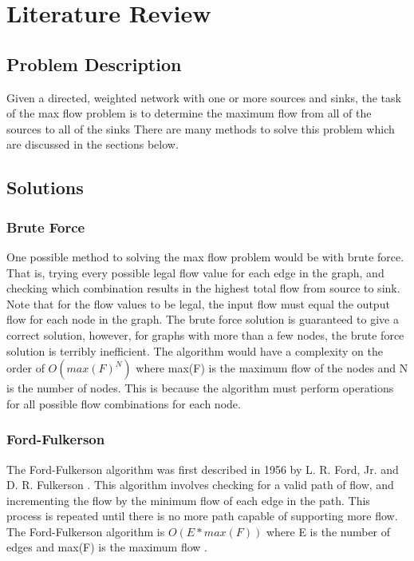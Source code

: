 \documentclass[12pt]{report}
\begin{document}
\section*{Literature Review}

\subsection*{Problem Description}
Given a directed, weighted network with one or more sources and sinks, the task of the max flow problem is to determine the maximum flow from all of the sources to all of the sinks \cite{illinois} There are many methods to solve this problem which are discussed in the sections below.

\subsection*{Solutions}

\subsubsection*{Brute Force}

One possible method to solving the max flow problem would be with brute force. That is, trying every possible legal flow value for each edge in the graph, and checking which combination results in the highest total flow from source to sink. Note that for the flow values to be legal, the input flow must equal the output flow for each node in the graph. The brute force solution is guaranteed to give a correct solution, however, for graphs with more than a few nodes, the brute force solution is terribly inefficient. The algorithm would have a complexity on the order of $O(max(F) ^ N)$ where max(F) is the maximum flow of the nodes and N is the number of nodes. This is because the algorithm must perform operations for all possible flow combinations for each node.

\subsubsection*{Ford-Fulkerson}

The Ford-Fulkerson algorithm was first described in 1956 by L. R. Ford, Jr. and D. R. Fulkerson \cite{wiki}. This algorithm involves checking for a valid path of flow, and incrementing the flow by the minimum flow of each edge in the path. This process is repeated until there is no more path capable of supporting more flow. The Ford-Fulkerson algorithm is $O(E*max(F))$ where E is the number of edges and max(F) is the maximum flow \cite{illinois}.
\end{document}
